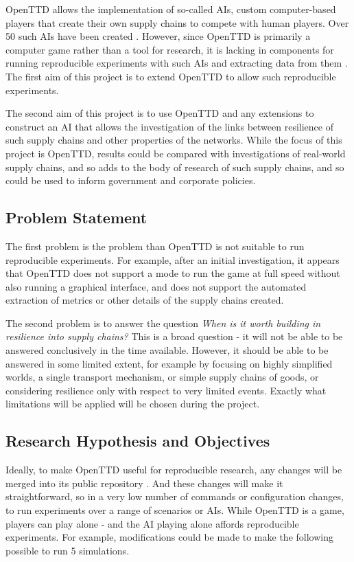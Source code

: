 \documentclass[a4paper,11pt]{article}
\begin{document}
OpenTTD allows the implementation of so-called AIs, custom computer-based players that create their own supply chains to compete with human players. Over 50 such AIs have been created \cite{openttdAIs}. However, since OpenTTD is primarily a computer game rather than a tool for research, it is lacking in components for running reproducible experiments with such AIs and extracting data from them \cite{openttdNoHeadless}. The first aim of this project is to extend OpenTTD to allow such reproducible experiments.

The second aim of this project is to use OpenTTD and any extensions to construct an AI that allows the investigation of the links between resilience of such supply chains and other properties of the networks. While the focus of this project is OpenTTD, results could be compared with investigations of real-world supply chains, and so adds to the body of research of such supply chains, and so could be used to inform government and corporate policies.

\subsection{Problem Statement}

The first problem is the problem than OpenTTD is not suitable to run reproducible experiments. For example, after an initial investigation, it appears that OpenTTD does not support a mode to run the game at full speed without also running a graphical interface, and does not support the automated extraction of metrics or other details of the supply chains created.

The second problem is to answer the question \emph{When is it worth building in resilience into supply chains?} This is a broad question - it will not be able to be answered conclusively in the time available. However, it should be able to be answered in some limited extent, for example by focusing on highly simplified worlds, a single transport mechanism, or simple supply chains of goods, or considering resilience only with respect to very limited events. Exactly what limitations will be applied will be chosen during the project.

\subsection{Research Hypothesis and Objectives}

Ideally, to make OpenTTD useful for reproducible research, any changes will be merged into its public repository \cite{openttdRepo}. And these changes will make it straightforward, so in a very low number of commands or configuration changes, to run experiments over a range of scenarios or AIs. While OpenTTD is a game, players can play alone - and the AI playing alone affords reproducible experiments. For example, modifications could be made to make the following possible to run 5 simulations.
\end{document}
